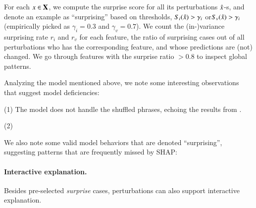 For each $x \in \mathbf{X}$, we compute the surprise score for all its perturbations $\hat{x}$-s, and denote an example as ``surprising'' based on thresholds, \ie $S_i(\hat{x}) > \gamma_i$ or$S_v(\hat{x}) > \gamma_i$ (empirically picked as $\gamma_i=0.3$ and $\gamma_v=0.7$).
We count the (in-)variance surprising rate $r_i$ and $r_v$ for each feature, \ie the ratio of surprising cases out of all perturbations who has the corresponding feature, and whose predictions are (not) changed.
We go through features with the surprise ratio $> 0.8$ to inspect global patterns.

Analyzing the \nli model mentioned above, we note some interesting observations that suggest model deficiencies:

(1) The model does not handle the shuffled phrases, echoing the results from \citet{mccoy2019right}.


(2) 

We also note some valid model behaviors that are denoted ``surprising'', suggesting patterns that are frequently missed by SHAP: 



\paragraph{Interactive explanation.}
Besides pre-selected \emph{surprise} cases, perturbations can also support interactive explanation. 

